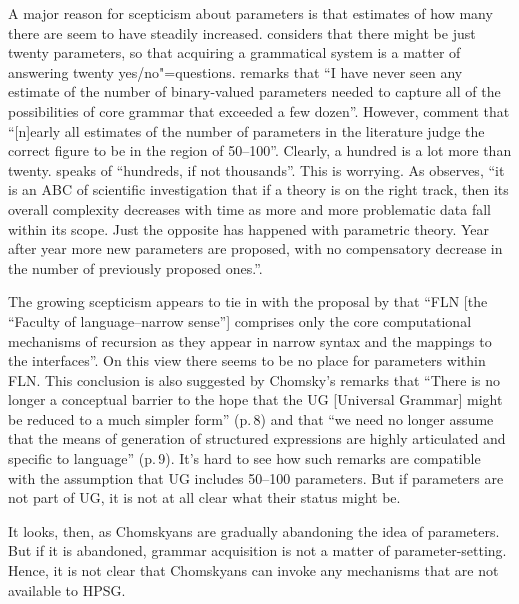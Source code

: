 \documentclass[output=paper]{langsci/langscibook}
\begin{document}
A major reason for scepticism about parameters is that estimates of how many there are seem to have
steadily increased. \citet[]{Fodor2001a-u} considers that there might be just twenty parameters, so that
acquiring a grammatical system is a matter of answering twenty yes/no"=questions. \citet[]{Newmeyer2005a} remarks that ``I have never seen any estimate of the number of binary-valued
parameters needed to capture all of the possibilities of core grammar that exceeded a few
dozen''. However, \citet{RH2005a} comment that ``[n]early all estimates of the number of
parameters in the literature judge the correct figure to be in the region of 50--100''. Clearly, a
hundred is a lot more than twenty. \citet[Section~6.3]{Newmeyer2017a} speaks of ``hundreds, if not thousands''.
This is worrying. As \citet[]{Newmeyer2006a-u} observes, ``it
is an ABC of scientific investigation that if a theory is on the right track, then its overall
complexity decreases with time as more and more problematic data fall within its scope. Just the
opposite has happened with parametric theory. Year after year more new parameters are proposed, with
no compensatory decrease in the number of previously proposed ones.''.

The growing scepticism appears to tie in with the proposal by \citet*[]{HCF2002a}
that ``FLN [the ``Faculty of language--narrow sense''] comprises only the core computational mechanisms of
recursion as they appear in narrow syntax and the mappings to the interfaces''. On this view there
seems to be no place for parameters within FLN. This conclusion is also suggested by Chomsky’s
remarks \citeyearpar{Chomsky2005a} that ``There is no longer a conceptual barrier to the hope that the UG [Universal
  Grammar] might be reduced to a much simpler form'' (p.\,8) and that ``we need no longer assume that
the means of generation of structured expressions are highly articulated and specific to language''
(p.\,9). It’s hard to see how such remarks are compatible with the assumption that UG includes 50--100
parameters. But if parameters are not part of UG, it is not at all clear what their status might be.

It looks, then, as Chomskyans are gradually abandoning the idea of parameters. But if it is
abandoned, grammar acquisition is not a matter of parameter-setting. Hence, it is not clear that
Chomskyans can invoke any mechanisms that are not available to HPSG.
\end{document}
